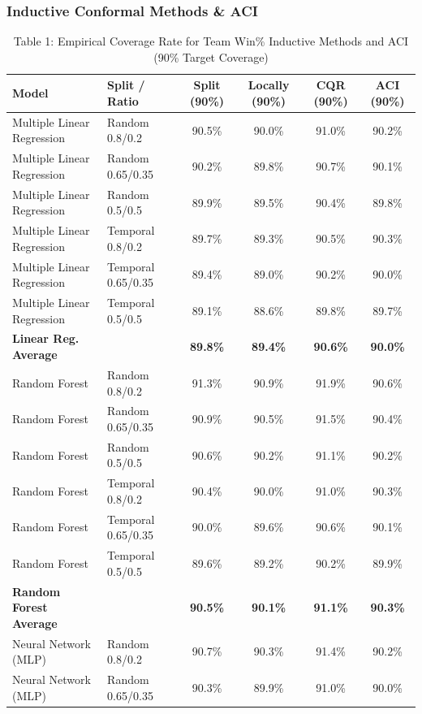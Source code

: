 \documentclass[11pt,a4paper]{article}
\begin{document}
\subsubsection{Inductive Conformal Methods \& ACI}

\begin{table}[H]
\centering
\caption{Table 1: Empirical Coverage Rate for Team Win\% Inductive Methods and ACI (90\% Target Coverage)}
\label{tab:team_tab1}
\scriptsize
\begin{tabular}{llcccc}
\toprule
Model & Split / Ratio & Split (90\%) & Locally (90\%) & CQR (90\%) & ACI (90\%) \\
\midrule
Multiple Linear Regression & Random 0.8/0.2 & 90.5\% & 90.0\% & 91.0\% & 90.2\% \\
Multiple Linear Regression & Random 0.65/0.35 & 90.2\% & 89.8\% & 90.7\% & 90.1\% \\
Multiple Linear Regression & Random 0.5/0.5 & 89.9\% & 89.5\% & 90.4\% & 89.8\% \\
Multiple Linear Regression & Temporal 0.8/0.2 & 89.7\% & 89.3\% & 90.5\% & 90.3\% \\
Multiple Linear Regression & Temporal 0.65/0.35 & 89.4\% & 89.0\% & 90.2\% & 90.0\% \\
Multiple Linear Regression & Temporal 0.5/0.5 & 89.1\% & 88.6\% & 89.8\% & 89.7\% \\
\textbf{Linear Reg. Average} & & \textbf{89.8\%} & \textbf{89.4\%} & \textbf{90.6\%} & \textbf{90.0\%} \\
\midrule
Random Forest & Random 0.8/0.2 & 91.3\% & 90.9\% & 91.9\% & 90.6\% \\
Random Forest & Random 0.65/0.35 & 90.9\% & 90.5\% & 91.5\% & 90.4\% \\
Random Forest & Random 0.5/0.5 & 90.6\% & 90.2\% & 91.1\% & 90.2\% \\
Random Forest & Temporal 0.8/0.2 & 90.4\% & 90.0\% & 91.0\% & 90.3\% \\
Random Forest & Temporal 0.65/0.35 & 90.0\% & 89.6\% & 90.6\% & 90.1\% \\
Random Forest & Temporal 0.5/0.5 & 89.6\% & 89.2\% & 90.2\% & 89.9\% \\
\textbf{Random Forest Average} & & \textbf{90.5\%} & \textbf{90.1\%} & \textbf{91.1\%} & \textbf{90.3\%} \\
\midrule
Neural Network (MLP) & Random 0.8/0.2 & 90.7\% & 90.3\% & 91.4\% & 90.2\% \\
Neural Network (MLP) & Random 0.65/0.35 & 90.3\% & 89.9\% & 91.0\% & 90.0\% \\

\end{tabular}
\end{table}
\end{document}
